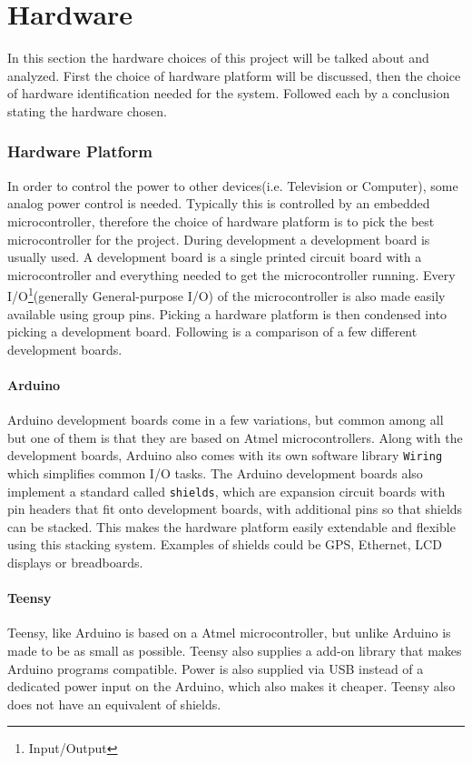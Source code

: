 \chapter{Hardware}
\label{chap:hardware}
In this section the hardware choices of this project will be talked about and analyzed. First the choice of hardware platform will be discussed, then the choice of hardware identification needed for the system. Followed each by a conclusion stating the hardware chosen.

\subsection{Hardware Platform}
In order to control the power to other devices(i.e. Television or Computer), some analog power control is needed. Typically this is controlled by an embedded microcontroller, therefore the choice of hardware platform is to pick the best microcontroller for the project. During development a development board is usually used. A development board is a single printed circuit board with a microcontroller and everything needed to get the microcontroller running. Every I/O\footnote{Input/Output}(generally General-purpose I/O) of the microcontroller is also made easily available using group pins. Picking a hardware platform is then condensed into picking a development board. Following is a comparison of a few different development boards.

\subsubsection{Arduino}
Arduino development boards come in a few variations, but common among all but one of them is that they are based on Atmel microcontrollers. Along with the development boards, Arduino also comes with its own software library \texttt{Wiring} which simplifies common I/O tasks. The Arduino development boards also implement a standard called \texttt{shields}, which are expansion circuit boards with pin headers that fit onto development boards, with additional pins so that shields can be stacked. This makes the hardware platform easily extendable and flexible using this stacking system. Examples of shields could be GPS, Ethernet, LCD displays or breadboards.


\subsubsection{Teensy}
Teensy, like Arduino is based on a Atmel microcontroller, but unlike Arduino is made to be as small as possible. Teensy also supplies a add-on library that makes Arduino programs compatible. Power is also supplied via USB instead of a dedicated power input on the Arduino, which also makes it cheaper. Teensy also does not have an equivalent of shields.


